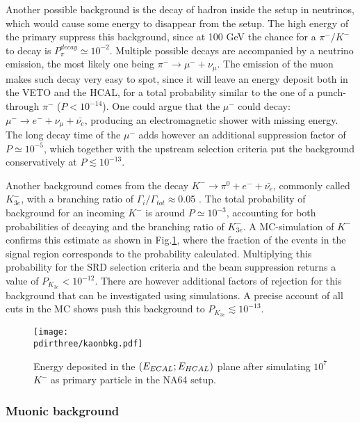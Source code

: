 Another possible background is the decay of hadron inside the setup in neutrinos, which would cause some energy to disappear from the setup. The high energy of the primary suppress this background, since at 100 GeV the chance for a $\pi^-/K^-$ to decay is $P^{decay}_{\pi} \simeq  10^{-2}$. Multiple possible decays are accompanied by a neutrino emission, the most likely one being $\pi^- \rightarrow \mu^- +\nu_{\mu}$. The emission of the muon makes such decay very easy to spot, since it will leave an energy deposit both in the VETO and the HCAL, for a total probability similar to the one of a punch-through $\pi^-$ ($P < 10^{-14}$). One could argue that the $\mu^-$ could decay: $\mu^- \rightarrow e^- + \nu_{\mu}+ \bar{\nu_{e}}$, producing an electromagnetic shower with missing energy. The long decay time of the $\mu^-$ adds however an additional suppression factor of $P\simeq 10^{-5}$, which together with the upstream selection criteria put the background conservatively at $P \lesssim 10^{-13}$.

Another background comes from the decay $K^- \rightarrow \pi^0 + e^- + \bar{\nu_e}$, commonly called $K^-_{3e}$, with a branching ratio of $\Gamma_i/\Gamma_{tot} \approx$0.05 \cite{particle-strange-mesons}. The total probability of background for an incoming $K^-$ is around $P\simeq 10^{-3}$, accounting for both probabilities of decaying and the branching ratio of $K^-_{3e}$. A MC-simulation of $K^-$ confirms this estimate as shown in Fig.\ref{fig:kaonbkg-sim}, where the fraction of the events in the signal region corresponds to the probability calculated. 
Multiplying this probability for the SRD selection criteria and the beam suppression returns a value of $P_{K_{3e}} < 10^{-12}$.
There are however additional factors of rejection for this background that can be investigated using simulations. A precise account of all cuts in the MC shows push this background to $P_{K_{3e}} \lesssim 10^{-13}$.


\begin{figure}[bth!]
  \centering
  \texttt{[image: \\pdirthree/kaonbkg.pdf]}
  \caption[$K^-$ simulation ]{Energy deposited in the $(E_{ECAL};E_{HCAL})$ plane after simulating $10^7$ $K^-$ as primary particle in the NA64 setup.}
  \label{fig:kaonbkg-sim}
\end{figure}

\subsubsection{Muonic background}
\label{ch3:sec:bkg:inv:muon}

